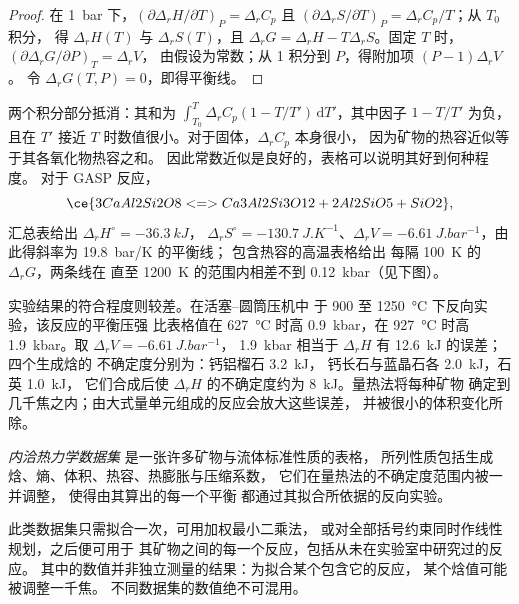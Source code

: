 \begin{proof}
在 \qty{1}{bar} 下，$(\partial\Delta_rH/\partial T)_P = \Delta_rC_p$ 且
$(\partial\Delta_rS/\partial T)_P = \Delta_rC_p/T$；从 $T_0$ 积分，
得 $\Delta_rH(T)$ 与 $\Delta_rS(T)$，且 $\Delta_rG = \Delta_rH -
T\Delta_rS$。固定 $T$ 时，$(\partial\Delta_rG/\partial P)_T = \Delta_rV$，
由假设为常数；从 1 积分到 $P$，得附加项 $(P - 1)\Delta_rV$。
令 $\Delta_rG(T, P) = 0$，即得平衡线。
\end{proof}

两个积分部分抵消：其和为 $\int_{T_0}^T\Delta_rC_p(1 -
T/T')\,\mathrm dT'$，其中因子 $1 - T/T'$ 为负，
且在 $T'$ 接近 $T$ 时数值很小。对于固体，$\Delta_rC_p$ 本身很小，
因为矿物的热容近似等于其各氧化物热容之和。
因此常数近似是良好的，表格可以说明其好到何种程度。
对于 GASP 反应，
\[
  \ce{3 CaAl2Si2O8 <=> Ca3Al2Si3O12 + 2 Al2SiO5 + SiO2},
\]
汇总表给出 $\Delta_rH^\circ = \qty{-36.3}{kJ}$，
$\Delta_rS^\circ = \qty{-130.7}{J.K^{-1}}$、$\Delta_rV =
\qty{-6.61}{J.bar^{-1}}$，由此得斜率为 \qty{19.8}{bar/K} 的平衡线；
包含热容的高温表格给出
每隔 \qty{100}{K} 的 $\Delta_rG$，两条线在
直至 \qty{1200}{K} 的范围内相差不到 \qty{0.12}{kbar}（见下图）。

实验结果的符合程度则较差。在活塞–圆筒压机中
于 900 至 \qty{1250}{\celsius} 下反向实验，该反应的平衡压强
比表格值在 \qty{627}{\celsius} 时高 \qty{0.9}{kbar}，在
\qty{927}{\celsius} 时高 \qty{1.9}{kbar}。取 $\Delta_rV = \qty{-6.61}{J.bar^{-1}}$，
\qty{1.9}{kbar} 相当于 $\Delta_rH$ 有 \qty{12.6}{kJ} 的误差；四个生成焓的
不确定度分别为：钙铝榴石 \qty{3.2}{kJ}，
钙长石与蓝晶石各 \qty{2.0}{kJ}，石英 \qty{1.0}{kJ}，
它们合成后使 $\Delta_rH$ 的不确定度约为 \qty{8}{kJ}。量热法将每种矿物
确定到几千焦之内；由大式量单元组成的反应会放大这些误差，
并被很小的体积变化所除。

\begin{definition}[内洽热力学数据集]\label{def:b3:petrological-thermodynamics:dataset}
\emph{内洽热力学数据集}
是一张许多矿物与流体标准性质的表格，
所列性质包括生成焓、熵、体积、热容、热膨胀与压缩系数，
它们在量热法的不确定度范围内被一并调整，
使得由其算出的每一个平衡
都通过其拟合所依据的反向实验。
\end{definition}

此类数据集只需拟合一次，可用加权最小二乘法，
或对全部括号约束同时作线性规划，之后便可用于
其矿物之间的每一个反应，包括从未在实验室中研究过的反应。
其中的数值并非独立测量的结果：为拟合某个包含它的反应，
某个焓值可能被调整一千焦。
不同数据集的数值绝不可混用。

